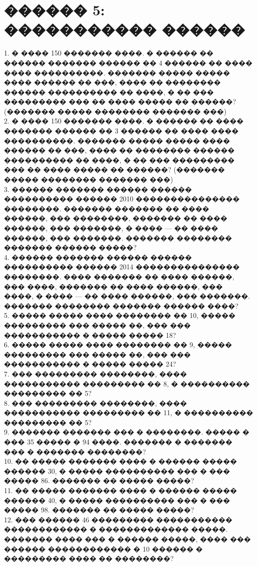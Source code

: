 \documentclass[12pt]{article}
\begin{document}
\section{������ 5: ����������� ������}
1. � ���� 150 ������� ����. � ������ �� ������ ������� ������ �� 4 ������ �� ���� ���� ����������. ������� ����� ����� ���� ������ �� ���, ���� �� �������� ������ ���������� �� ����, � �� ��� ��������� ��� �� ���� ����� �� ������? (������� ����� �������� ������� ���)\\
2. � ���� 150 ������� ����. � ������ �� ���� ������� ������ �� 3 ������ �� ���� ���� ����������. ������� ����� ����� ���� ������ �� ���, ���� �� �������� ������ ���������� �� ����, � �� ��� ��������� ��� �� ���� ����� �� ������? (������� ����� �������� ������� ���)\\
3. ������ ������� ������ ������ ���������� ������ 2010 ��������������� ��������. ������� ������� �� ���� ������, ��� ��������, ������� �� ���� ������, ��� �������, � ���� --- �� ���� ������, ��� �������. ������� �������� ������� ������ �����?\\
4. ������ ������� ������ ������ ���������� ������ 2014 ��������������� ��������. ���� ������� �� ���� ������, ��� ����, ������� �� ���� ������, ��� ����, � ���� --- �� ���� ������, ��� �������. ������� �������� ������� ������ ����?\\
5. ����� ����� ���� �������� �� 10, ����� ��������� ��� ����� ��, ��� ��� ����������� � ����� ����� 18?\\
6. ����� ����� ���� �������� �� 9, ����� ��������� ��� ����� ��, ��� ��� ����������� � ����� ����� 24?\\
7. ��� ��������� ��������, ���� ����������� ��������� �� 8, � ���������� ��������� �� 5?\\
8. ��� ��������� ��������, ���� ����������� ��������� �� 11, � ���������� ��������� �� 5?\\
9. ������� ������� ��� � ��������. ����� � ��� 35 ����� � 94 ����. ������� � ������� ��� � ������� ��������?\\
10. �� ����� ������� ���� � ������ ����� ������ 30, � ����� ���������� ��� � ��� ����� 86. ������� �� ����� �����?\\
11. �� ����� ������� ���� � ������ ����� ������ 40, � ����� ���������� ��� � ��� ����� 98. ������� �� ����� �����?\\
12. ��� ������ 46 ��������� ����������� ������������ � ������������� �����. ������� ���� ��� � ������ �����, ���� ��� ������ ������������ � 10 ������ � ��������� ���� �� ��������?\\
\end{document}
